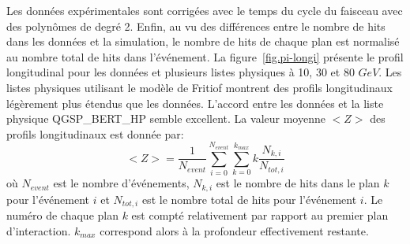 Les données expérimentales sont corrigées avec le temps du cycle du faisceau avec des polynômes de degré 2. Enfin, au vu des différences entre le nombre de hits dans les données et la simulation, le nombre de hits de chaque plan est normalisé au nombre total de hits dans l'événement. 
La figure~\ref{fig.pi-longi} présente le profil longitudinal pour les données et plusieurs listes physiques à 10, 30 et 80 $GeV$. Les listes physiques utilisant le modèle de Fritiof montrent des profils longitudinaux légèrement plus étendus que les données. L'accord entre les données et la liste physique QGSP\_BERT\_HP semble excellent. La valeur moyenne $<Z>$ des profils longitudinaux est donnée par:
\begin{equation}
  <Z>=\frac{1}{N_{event}}\sum_{i=0}^{N_{event}}\sum_{k=0}^{k_{max}}k\frac{N_{k,i}}{N_{tot,i}}
\end{equation}
où $N_{event}$ est le nombre d'événements, $N_{k,i}$ est le nombre de hits dans le plan $k$ pour l'événement $i$ et $N_{tot,i}$ est le nombre total de hits pour l'événement $i$. Le numéro de chaque plan $k$ est compté relativement par rapport au premier plan d'interaction. $k_{max}$ correspond alors à la profondeur effectivement restante.
